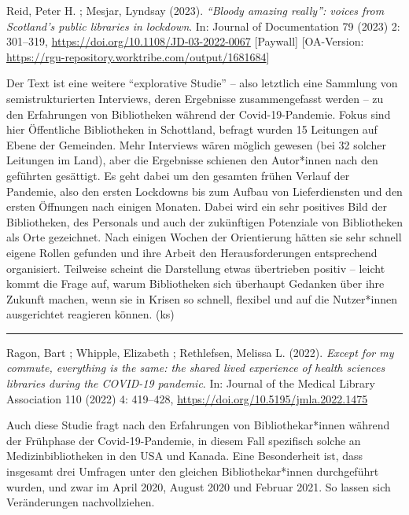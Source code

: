 \documentclass[a4paper,
fontsize=11pt,
oneside,
numbers=noperiodatend,
parskip=half-,
bibliography=totoc,
final
]{scrartcl}
\begin{document}
Reid, Peter H. ; Mesjar, Lyndsay (2023). \emph{\enquote{Bloody amazing
really}: voices from Scotland's public libraries in lockdown}. In:
Journal of Documentation 79 (2023) 2: 301--319,
\url{https://doi.org/10.1108/JD-03-2022-0067} {[}Paywall{]}
{[}OA-Version:
\url{https://rgu-repository.worktribe.com/output/1681684}{]}

Der Text ist eine weitere \enquote{explorative Studie} -- also letztlich
eine Sammlung von semistrukturierten Interviews, deren Ergebnisse
zusammengefasst werden -- zu den Erfahrungen von Bibliotheken während
der Covid-19-Pandemie. Fokus sind hier Öffentliche Bibliotheken in
Schottland, befragt wurden 15 Leitungen auf Ebene der Gemeinden. Mehr
Interviews wären möglich gewesen (bei 32 solcher Leitungen im Land),
aber die Ergebnisse schienen den Autor*innen nach den geführten
gesättigt. Es geht dabei um den gesamten frühen Verlauf der Pandemie,
also den ersten Lockdowns bis zum Aufbau von Lieferdiensten und den
ersten Öffnungen nach einigen Monaten. Dabei wird ein sehr positives
Bild der Bibliotheken, des Personals und auch der zukünftigen Potenziale
von Bibliotheken als Orte gezeichnet. Nach einigen Wochen der
Orientierung hätten sie sehr schnell eigene Rollen gefunden und ihre
Arbeit den Herausforderungen entsprechend organisiert. Teilweise scheint
die Darstellung etwas übertrieben positiv -- leicht kommt die Frage auf,
warum Bibliotheken sich überhaupt Gedanken über ihre Zukunft machen,
wenn sie in Krisen so schnell, flexibel und auf die Nutzer*innen
ausgerichtet reagieren können. (ks)

\begin{center}\rule{0.5\linewidth}{0.5pt}\end{center}

Ragon, Bart ; Whipple, Elizabeth ; Rethlefsen, Melissa L. (2022).
\emph{Except for my commute, everything is the same: the shared lived
experience of health sciences libraries during the COVID-19 pandemic}.
In: Journal of the Medical Library Association 110 (2022) 4: 419--428,
\url{https://doi.org/10.5195/jmla.2022.1475}

Auch diese Studie fragt nach den Erfahrungen von Bibliothekar*innen
während der Frühphase der Covid-19-Pandemie, in diesem Fall spezifisch
solche an Medizinbibliotheken in den USA und Kanada. Eine Besonderheit
ist, dass insgesamt drei Umfragen unter den gleichen Bibliothekar*innen
durchgeführt wurden, und zwar im April 2020, August 2020 und Februar
2021. So lassen sich Veränderungen nachvollziehen.
\end{document}
